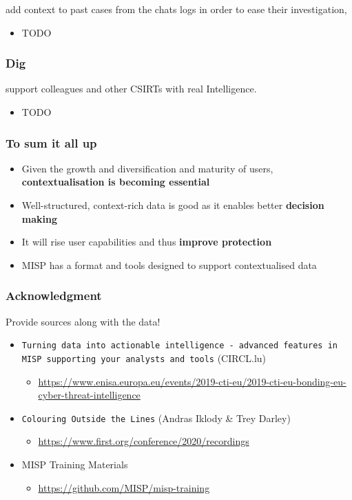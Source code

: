 \begin{frame}
        add context to past cases from the chats logs in order to ease their investigation,
    \begin{itemize}
        \item TODO
    \end{itemize}
\end{frame}


\begin{frame}[fragile]
    \frametitle{Dig}
        support colleagues and other CSIRTs with real Intelligence.
    \begin{itemize}
        \item TODO
    \end{itemize}
\end{frame}

\begin{frame}
    \frametitle{To sum it all up}
    \begin{itemize}
        \item Given the growth and diversification and maturity of users, \textbf{contextualisation is becoming essential}
        \item Well-structured, context-rich data is good as it enables better \textbf{decision making}
        \item It will rise user capabilities and thus \textbf{improve protection}
        \item MISP has a format and tools designed to support contextualised data
    \end{itemize}
\end{frame}

\begin{frame}
    \frametitle{Acknowledgment}
    Provide sources along with the data!
    \begin{itemize}
        \item \texttt{Turning data into actionable intelligence - advanced features in MISP supporting your analysts and tools} (CIRCL.lu)
        \begin{itemize}
            \item \tiny{\url{https://www.enisa.europa.eu/events/2019-cti-eu/2019-cti-eu-bonding-eu-cyber-threat-intelligence}}
        \end{itemize}
        \item \texttt{Colouring Outside the Lines} (Andras Iklody \& Trey Darley)
        \begin{itemize}
            \item \tiny{\url{https://www.first.org/conference/2020/recordings}}
        \end{itemize}
        \item MISP Training Materials
        \begin{itemize}
            \item \tiny{\url{https://github.com/MISP/misp-training}}
        \end{itemize}
    \end{itemize}
\end{frame}